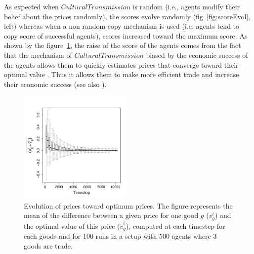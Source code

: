 \documentclass[a1paper,landscape,showframe,fontscale=.42]{baposter}
\begin{document}
\begin{poster}
{\begin{multicols}{2}
As expected when $CulturalTransmission$ is random (i.e., agents modify their belief about the prices randomly), the scores evolve randomly (fig~\ref{fig:scoreEvol}, left) whereas when a non random copy mechanism is used (i.e. agents tend to copy score of successful agents), scores increased toward the maximum score.
\vfil
\columnbreak
As shown by the figure~\ref{fig:ratioEvol}, the raise of the score of the agents comes from the fact that the mechanism of $CulturalTransmission$ biased by the economic success of the agents allows them to quickly estimates prices that converge toward their optimal value . Thus it allows them to make more efficient trade and increase their economic success (see also \cite{gintis_emergence_2006}).
\vspace{-.3cm}
\begin{figure}[H]
	\begin{multicols}{2}
	\begin{center}
		\includegraphics[width=5.5cm]{img/ClearingPriceDistanceEvolutionForTrade-G3N500.pdf}
	\end{center}
	\caption{
	    \small
	    Evolution of prices toward optimum prices. The figure represents the mean of the difference between a given price for one good $g$ ($v^i_g$) and the optimal value of this price ($\tilde{v}^i_g$), computed at each timestep for each goods and for 100 runs in a setup with 500 agents where 3 goods are trade.
	}
	\label{fig:ratioEvol}
	\end{multicols}
\end{figure}
	\end{multicols}

}


\end{poster}
\end{document}
